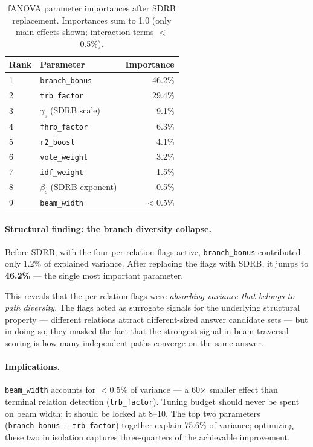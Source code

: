 \documentclass[10pt,twocolumn]{article}
\newcommand{\gS}{\gamma_{\mathrm{s}}}   %
\newcommand{\bS}{\beta_{\mathrm{s}}}    %
\newcommand{\SDRB}{\textsc{SDRB}}
\newcommand{\fanova}{f\textsc{ANOVA}}
\begin{document}
\begin{table}[h]
\centering
\caption{\fanova{} parameter importances after \SDRB{} replacement.
Importances sum to 1.0 (only main effects shown; interaction terms $<$0.5\%).}
\label{tab:fanova}
\begin{tabular}{llr}
\toprule
\textbf{Rank} & \textbf{Parameter} & \textbf{Importance} \\
\midrule
1 & \texttt{branch\_bonus}  & 46.2\% \\
2 & \texttt{trb\_factor}    & 29.4\% \\
3 & $\gS$ (SDRB scale)      &  9.1\% \\
4 & \texttt{fhrb\_factor}   &  6.3\% \\
5 & \texttt{r2\_boost}      &  4.1\% \\
6 & \texttt{vote\_weight}   &  3.2\% \\
7 & \texttt{idf\_weight}    &  1.5\% \\
8 & $\bS$ (SDRB exponent)   &  0.5\% \\
9 & \texttt{beam\_width}    &  $<$0.5\% \\
\bottomrule
\end{tabular}
\end{table}

\paragraph{Structural finding: the branch diversity collapse.}
Before \SDRB{}, with the four per-relation flags active, \texttt{branch\_bonus}
contributed only 1.2\% of explained variance.
After replacing the flags with \SDRB{}, it jumps to \textbf{46.2\%} ---
the single most important parameter.

This reveals that the per-relation flags were \emph{absorbing variance that
belongs to path diversity}. The flags acted as surrogate signals for the
underlying structural property --- different relations attract different-sized
answer candidate sets --- but in doing so, they masked the fact that the strongest
signal in beam-traversal scoring is how many independent paths converge on
the same answer.

\paragraph{Implications.}
\texttt{beam\_width} accounts for $<0.5\%$ of variance --- a 60$\times$ smaller
effect than terminal relation detection (\texttt{trb\_factor}). Tuning budget
should never be spent on beam width; it should be locked at 8--10.
The top two parameters (\texttt{branch\_bonus} + \texttt{trb\_factor}) together
explain 75.6\% of variance; optimizing these two in isolation captures
three-quarters of the achievable improvement.
\end{document}
